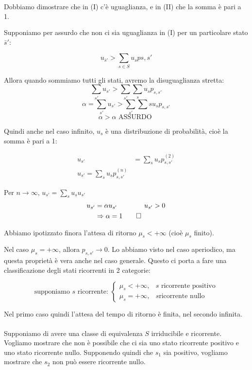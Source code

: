 \documentclass[a4paper,12pt]{book}
\begin{document}
Dobbiamo dimostrare che in (I) c'è uguaglianza, e in (II) che la somma è pari a 1.

Supponiamo per assurdo che non ci sia uguaglianza in (I) per un particolare stato $\bar{s}'$:

$$ u_{\bar{s}'} > \sum_{s \in S} u_s p{s,s'} $$

Allora quando sommiamo tutti gli stati, avremo la disuguaglianza stretta:
$$ \sum_{s'} u_{s'} > \sum_{s'} \sum_{s} u_s p_{s,s'} $$
$$ \alpha = \sum_{s'} u_{s'} > \sum_{s'} \sum{s} u_s p_{s,s'}$$
$$ \alpha > \alpha \text{ ASSURDO } $$

Quindi anche nel caso infinito, $ u_s $ è una distribuzione di probabilità, cioè la somma è pari a 1:

\begin{align*}
	u_{s'} & = \sum_{s} u_s p_{s,s'}^{(2)} \\
	u_{s'} = \sum_{s} u_s p_{s,s'} ^{(n)}
\end{align*}

Per $ n \to \infty $, $ u_{s'} = \sum_{s} u_su_{s'}$
\begin{align*}
u_{s'} & = \alpha u_{s'} \qquad \qquad u_{s'} > 0 \\
& \Rightarrow \alpha = 1 \qed
\end{align*}

Abbiamo ipotizzato finora l'attesa di ritorno $\mu_s < +\infty$ (cioè $\mu_s$ finito).

Nel caso $\mu_s = + \infty$, allora $ p_{s,s'} \to 0 $. Lo abbiamo visto nel caso aperiodico, ma questa proprietà è vera anche nel caso generale. Questo ci porta a fare una classificazione degli stati ricorrenti in 2 categorie:

$$ \text{supponiamo } s \text{ ricorrente: } \begin{cases*}
	\mu_s < +\infty, & s \text{ ricorrente positivo} \\
	\mu_s = + \infty, & s \text{ricorrente nullo}
\end{cases*}$$

Nel primo caso quindi l'attesa del tempo di ritorno è finita, nel secondo infinita. 
\\
\\
Supponiamo di avere una classe di equivalenza $ S $ irriducibile e ricorrente. Vogliamo mostrare che non è possibile che ci sia uno stato ricorrente positivo e uno stato ricorrente nullo. Supponendo quindi che $ s_1 $ sia positivo, vogliamo mostrare che $ s_2 $ non può essere ricorrente nullo. 
\end{document}
